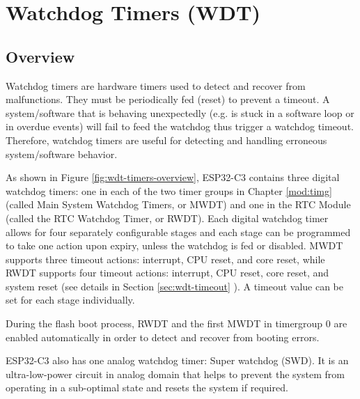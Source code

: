 \documentclass[main\_\_EN.tex]{subfiles}
\begin{document}

\ifglobal
\else
    {\let\clearpage\relax \listoftodos}
    \tableofcontents
\fi



\hypertarget{wdt}{}
\chapter{Watchdog Timers (WDT)}
\label{mod:wdt}



\section{Overview}

Watchdog timers are hardware timers used to detect and recover from malfunctions. They must be periodically fed (reset) to prevent a timeout. A system/software that is behaving unexpectedly (e.g. is stuck in a software loop or in overdue events) will fail to feed the watchdog thus trigger a watchdog timeout. Therefore, watchdog timers are useful for detecting and handling erroneous system/software behavior.

As shown in Figure \ref{fig:wdt-timers-overview}, ESP32-C3 contains three digital watchdog timers: one in each of the two timer groups in Chapter \ref{mod:timg} \textit{}(called Main System Watchdog Timers, or MWDT) and one in the RTC Module (called the RTC Watchdog Timer, or RWDT).  Each digital watchdog timer allows for four separately configurable stages and each stage can be programmed to take one action upon expiry, unless the watchdog is fed or disabled. MWDT supports three timeout actions: interrupt, CPU reset, and core reset, while RWDT supports four timeout actions: interrupt, CPU reset, core reset, and system reset (see details in Section \ref{sec:wdt-timeout} \textit{}). A timeout value can be set for each stage individually.

During the flash boot process, RWDT and the first MWDT in timergroup 0 are enabled automatically in order to detect and recover from booting errors. 

ESP32-C3 also has one analog watchdog timer: Super watchdog (SWD). It is an ultra-low-power circuit in analog domain that helps to prevent the system from operating in a sub-optimal state and resets the system if required.
\end{document}
